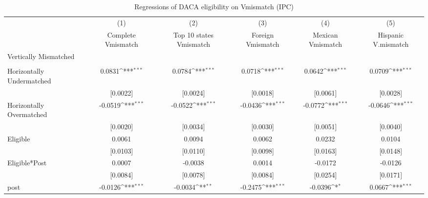 \begin{table}[htbp]\centering
\def\sym#1{\ifmmode^{#1}\else\(^{#1}\)\fi}
\caption{Regressions of DACA eligibility on Vmismatch (IPC)}
\begin{tabular}{l*{5}{c}}
\toprule
                    &\multicolumn{1}{c}{(1)}         &\multicolumn{1}{c}{(2)}         &\multicolumn{1}{c}{(3)}         &\multicolumn{1}{c}{(4)}         &\multicolumn{1}{c}{(5)}         \\
                    &Complete Vmismatch         &Top 10 states Vmismatch         &Foreign Vmismatch         &Mexican Vmismatch         &Hispanic V.mismatch         \\
\midrule
Vertically Mismatched&                     &                     &                     &                     &                     \\
                    &                     &                     &                     &                     &                     \\
\addlinespace
Horizontally Undermatched&      0.0831\sym{***}&      0.0784\sym{***}&      0.0718\sym{***}&      0.0642\sym{***}&      0.0709\sym{***}\\
                    &    [0.0022]         &    [0.0024]         &    [0.0018]         &    [0.0061]         &    [0.0028]         \\
\addlinespace
Horizontally Overmatched&     -0.0519\sym{***}&     -0.0522\sym{***}&     -0.0436\sym{***}&     -0.0772\sym{***}&     -0.0646\sym{***}\\
                    &    [0.0020]         &    [0.0034]         &    [0.0030]         &    [0.0051]         &    [0.0040]         \\
\addlinespace
Eligible            &      0.0061         &      0.0094         &      0.0062         &      0.0232         &      0.0104         \\
                    &    [0.0103]         &    [0.0110]         &    [0.0098]         &    [0.0163]         &    [0.0148]         \\
\addlinespace
Eligible*Post       &      0.0007         &     -0.0038         &      0.0014         &     -0.0172         &     -0.0126         \\
                    &    [0.0084]         &    [0.0078]         &    [0.0084]         &    [0.0254]         &    [0.0171]         \\
\addlinespace
post                &     -0.0126\sym{***}&     -0.0034\sym{**} &     -0.2475\sym{***}&     -0.0396\sym{*}  &      0.0667\sym{***}\\

\end{tabular}
\end{table}
